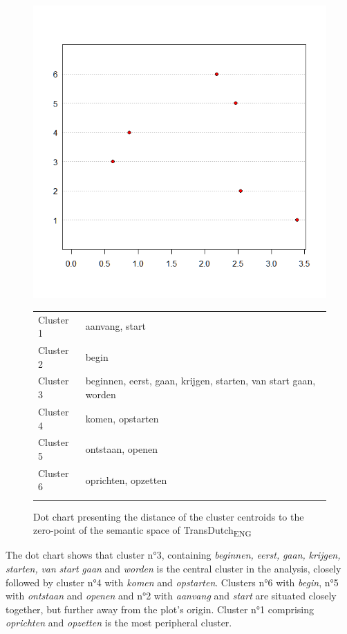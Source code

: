 \begin{figure} 
\includegraphics[height=.4\textheight]{figures/Vandevoorde2-img68.png}
\scripsize
\begin{tabular}{ll}
\lsptoprule
Cluster 1 & aanvang, start\\
Cluster 2 & begin\\
Cluster 3 & beginnen, eerst, gaan, krijgen, starten, van start gaan, worden\\
Cluster 4 & komen, opstarten\\
Cluster 5 & ontstaan, openen\\
Cluster 6 & oprichten, opzetten\\
\lspbottomrule
\end{tabular}
\normalsize
\caption{\label{fig:4:kmeansdutch6}  Dot chart presenting the distance of the cluster centroids to the zero-point of the semantic space of TransDutch\textsubscript{ENG}}
\end{figure}

The dot chart shows that cluster n°3, containing \textit{beginnen,} \textit{eerst,} \textit{gaan,} \textit{krijgen,} \textit{starten,} \textit{van} \textit{start} \textit{gaan} and \textit{worden} is the central cluster in the analysis, closely followed by cluster n°4 with \textit{komen} and \textit{opstarten}. Clusters n°6 with \textit{begin}, n°5 with \textit{ontstaan} and \textit{openen} and n°2 with \textit{aanvang} and \textit{start} are situated closely together, but further away from the plot’s origin. Cluster n°1 comprising \textit{oprichten} and \textit{opzetten} is the most peripheral cluster.

